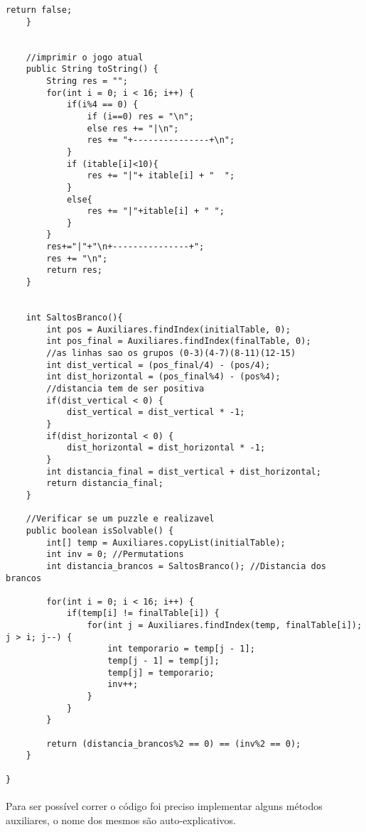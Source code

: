 \documentclass[12pt]{article}
\begin{document}
\begin{lstlisting}[frame=single]
        return false;
    }


    //imprimir o jogo atual
    public String toString() {
        String res = "";
        for(int i = 0; i < 16; i++) {
            if(i%4 == 0) {
                if (i==0) res = "\n";
                else res += "|\n";
                res += "+---------------+\n";
            }
            if (itable[i]<10){
                res += "|"+ itable[i] + "  ";
            }
            else{
                res += "|"+itable[i] + " ";
            }
        }
        res+="|"+"\n+---------------+";
        res += "\n";
        return res;
    }


    int SaltosBranco(){
        int pos = Auxiliares.findIndex(initialTable, 0);
        int pos_final = Auxiliares.findIndex(finalTable, 0);
        //as linhas sao os grupos (0-3)(4-7)(8-11)(12-15)
        int dist_vertical = (pos_final/4) - (pos/4);
        int dist_horizontal = (pos_final%4) - (pos%4);
        //distancia tem de ser positiva
        if(dist_vertical < 0) {
            dist_vertical = dist_vertical * -1;
        }    
        if(dist_horizontal < 0) {
            dist_horizontal = dist_horizontal * -1;
        }
        int distancia_final = dist_vertical + dist_horizontal;
        return distancia_final;
    }

    //Verificar se um puzzle e realizavel
    public boolean isSolvable() {
        int[] temp = Auxiliares.copyList(initialTable);
        int inv = 0; //Permutations
        int distancia_brancos = SaltosBranco(); //Distancia dos brancos

        for(int i = 0; i < 16; i++) {
            if(temp[i] != finalTable[i]) {
                for(int j = Auxiliares.findIndex(temp, finalTable[i]); j > i; j--) {
                    int temporario = temp[j - 1];
                    temp[j - 1] = temp[j];
                    temp[j] = temporario;
                    inv++;
                }
            }
        }

        return (distancia_brancos%2 == 0) == (inv%2 == 0);
    }

}
\end{lstlisting}
\paragraph{}
Para ser possível correr o código foi preciso implementar alguns métodos auxiliares, o nome dos mesmos são auto-explicativos.
\end{document}
